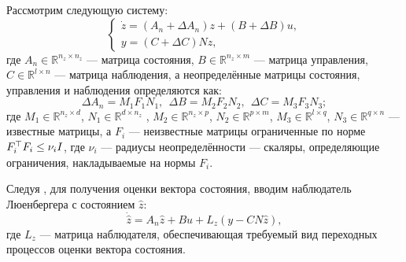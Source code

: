 Рассмотрим следующую систему: 
%
\begin{equation}
	\label{eq:part2_linear_dynamics}
	\begin{cases}
		\dot z=({A}_n+\Delta {A}_n)z + ({B}+\Delta {B})u,\\
		y = ({C}+ \Delta {C}){N}  z,
	\end{cases}
\end{equation}
%
где $A_n \in \mathbb{R}^{n_z \times n_z}$ --- матрица состояния, $B \in \mathbb{R}^{n_z \times m}$ --- матрица управления, $C \in \mathbb{R}^{l \times n}$ --- матрица наблюдения, а неопределённые матрицы состояния, управления и наблюдения определяются как:
%
\begin{equation}
	\label{eq:part2_uncertainty}
	\Delta {A}_n={M}_1{F}_1{N}_1, \ \ \Delta {B}= {M}_2{F}_2{N}_2, \ \
	\Delta {C} = {M}_3{F}_3{N}_3; 
\end{equation}
%
где ${M}_1 \in \mathbb{R}^{n_z \times d}$, 
${N}_1 \in \mathbb{R}^{d \times n_z}$ , ${M}_2 \in \mathbb{R}^{n_z \times p}$,
${N}_2 \in \mathbb{R}^{p \times m}$, ${M}_3 \in \mathbb{R}^{l \times q}$,
${N}_3 \in \mathbb{R}^{q \times n}$ --- известные матрицы, 
а ${F}_i$ --- неизвестные матрицы ограниченные по норме ${F}_i^\top{F}_i\leq \nu_i {I}$, где $\nu_i$ --- радиусы неопределённости --- скаляры, определяющие ограничения, накладываемые на нормы ${F}_i$. 

Следуя \cite{SAVIN2021}, для получения оценки вектора состояния, вводим наблюдатель Люенбергера с состоянием $\hat{z}$:
%
\begin{equation}
	\label{eq:Luenberger}
	\dot{\hat{z}}={A}_n\hat{z}+{B}u+{L}_z(y- {C} {N}\hat{z}),
\end{equation}
%
где ${L}_z$ --- матрица наблюдателя, обеспечивающая требуемый вид переходных процессов оценки вектора состояния. 
 
